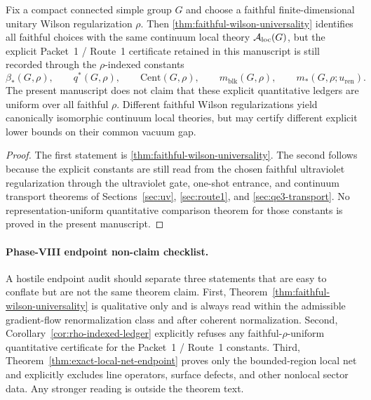 
\begin{corollary}\label{cor:rho-indexed-ledger}
Fix a compact connected simple group $G$ and choose a faithful finite-dimensional unitary Wilson regularization $\rho$. Then \cref{thm:faithful-wilson-universality} identifies all faithful choices with the same continuum local theory $\mathcal{A}_{\mathrm{loc}}(G)$, but the explicit Packet~1 / Route~1 certificate retained in this manuscript is still recorded through the $\rho$-indexed constants
\[
\beta_*(G,\rho),\qquad q^*(G,\rho),\qquad \mathrm{Cent}(G,\rho),\qquad m_{\mathrm{blk}}(G,\rho),\qquad m_*(G,\rho;u_{\mathrm{ren}}).
\]
The present manuscript does not claim that these explicit quantitative ledgers are uniform over all faithful $\rho$. Different faithful Wilson regularizations yield canonically isomorphic continuum local theories, but may certify different explicit lower bounds on their common vacuum gap.
\end{corollary}

\begin{proof}
The first statement is \cref{thm:faithful-wilson-universality}. The second follows because the explicit constants are still read from the chosen faithful ultraviolet regularization through the ultraviolet gate, one-shot entrance, and continuum transport theorems of Sections~\ref{sec:uv}, \ref{sec:route1}, and \ref{sec:qe3-transport}. No representation-uniform quantitative comparison theorem for those constants is proved in the present manuscript.
\end{proof}

\paragraph{Phase-VIII endpoint non-claim checklist.}
A hostile endpoint audit should separate three statements that are easy to conflate but are not the same theorem claim. First, Theorem~\ref{thm:faithful-wilson-universality} is qualitative only and is always read within the admissible gradient-flow renormalization class and after coherent normalization. Second, Corollary~\ref{cor:rho-indexed-ledger} explicitly refuses any faithful-$\rho$-uniform quantitative certificate for the Packet~1 / Route~1 constants. Third, Theorem~\ref{thm:exact-local-net-endpoint} proves only the bounded-region local net and explicitly excludes line operators, surface defects, and other nonlocal sector data. Any stronger reading is outside the theorem text.

